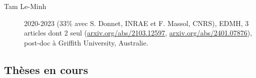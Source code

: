 \begin{description}
  \item[Tam Le-Minh] 2020-2023 (33\% avec S. Donnet, INRAE et F. Massol, CNRS), EDMH, 3 articles \cite{LDM25} dont 2 seul (\url{arxiv.org/abs/2103.12597}, \url{arxiv.org/abs/2401.07876}), post-doc à Griffith University, Australie.
\end{description}
 
\subsection{Thèses en cours }

